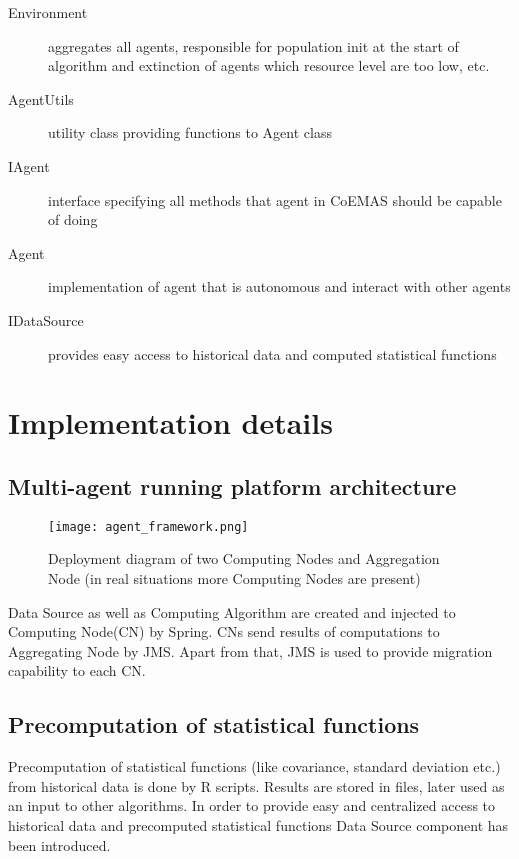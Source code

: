 \begin{description}
  \item [Environment]
      aggregates all agents, responsible for population init at the start of algorithm and extinction of agents which resource level are too low, etc.
  \item [AgentUtils]
      utility class providing functions to Agent class
  \item [IAgent]
      interface specifying all methods that agent in CoEMAS should be capable of doing
  \item [Agent]
      implementation of agent that is autonomous and interact with other agents
  \item [IDataSource]
      provides easy access to historical data and computed statistical functions
 
\end{description}



\section{Implementation details}
\label{sec:implDetails}


\subsection{Multi-agent running platform architecture}
\label{multi-agent}

\begin{figure}[ht]
  \begin{center}
    \texttt{[image: agent\_framework.png]}
  \end{center}
  \caption{Deployment diagram of two Computing Nodes and Aggregation Node (in real situations more Computing Nodes are present)}
\end{figure}

Data Source as well as Computing Algorithm are created and injected to Computing Node(CN) by Spring. 
CNs send results of computations to Aggregating Node by JMS. 
Apart from that, JMS is used to provide migration capability to each CN.


\subsection{Precomputation of statistical functions}
\label{precompute}
Precomputation of statistical functions (like covariance, standard deviation etc.) from historical data is done by R scripts. 
Results are stored in files, later used as an input to other algorithms.
In order to provide easy and centralized access to historical data and precomputed statistical functions Data Source component has been introduced. 

